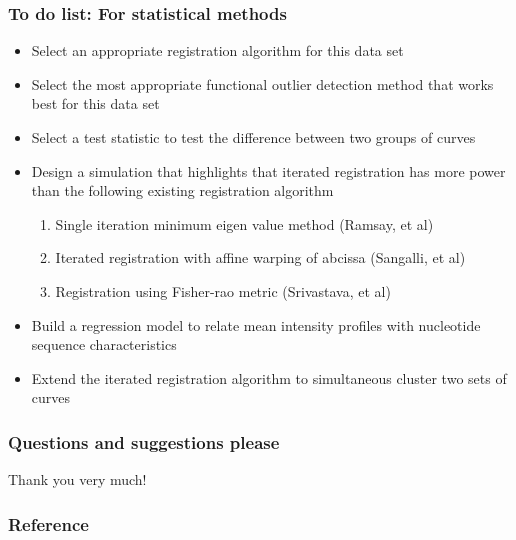 \documentclass[10pt,dvipsnames,table]{beamer}
\begin{document}
\begin{frame}
\frametitle{To do list: For statistical methods}
\begin{itemize}
\item[\checkmark] Select an appropriate registration algorithm for this data set
\item[\checkmark] Select the most appropriate functional outlier detection method that works best for this data set
\item[\checkmark] Select a test statistic to test the difference between two groups of curves
\item Design a simulation that highlights that iterated registration has more power than the following existing registration algorithm
\begin{enumerate}
\item Single iteration minimum eigen value method (Ramsay, et al)
\item Iterated registration with affine warping of abcissa (Sangalli, et al)
\item Registration using Fisher-rao metric (Srivastava, et al)
\end{enumerate}
\item Build a regression model to relate mean intensity profiles with nucleotide sequence characteristics
\item Extend the iterated registration algorithm to simultaneous cluster two sets of curves
\end{itemize}
\end{frame}

\begin{frame}
\frametitle{Questions and suggestions please}

Thank you very much!

\end{frame}

\begin{frame}
\frametitle{Reference}
{\footnotesize{
    
    
}}
\end{frame}
\end{document}
